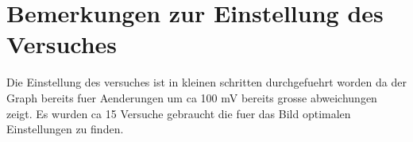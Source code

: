 \section{Bemerkungen zur Einstellung des Versuches}
Die Einstellung des versuches ist in kleinen schritten durchgefuehrt worden da der Graph bereits fuer Aenderungen um ca 100 mV bereits grosse abweichungen zeigt.
Es wurden ca 15 Versuche gebraucht die fuer das Bild optimalen Einstellungen zu finden.

